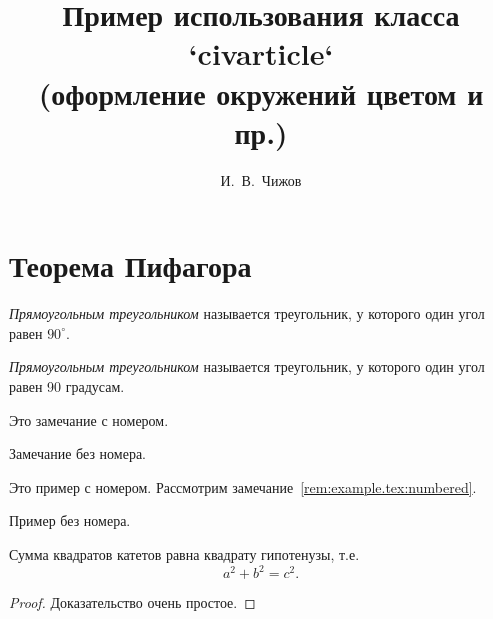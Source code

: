 \documentclass[colorthm, toc]{../civarticle}
\title{
    Пример использования класса `civarticle`\\
    \small{(оформление окружений цветом и пр.)}
}
\author{И.~В.~Чижов}
\begin{document}
\blindmathtrue

\begin{abstract}
  \Blindtext[2]
\end{abstract}

\civkeywords

\section{Теорема Пифагора}
\label{sec:thm-pif}

\begin{definition}\label{def:example.tex:triange}
  \emph{Прямоугольным треугольником} называется треугольник, у
  которого один угол равен \(90^{\circ}\).
\end{definition}

\Blindtext[2]

\begin{definition*}
  \emph{Прямоугольным треугольником} называется треугольник, у
  которого один угол равен 90 градусам.
\end{definition*}

\blindmathtrue\blindmathpaper

\begin{remark} \label{rem:example.tex:numbered}
  Это замечание с номером.
  \blindtext%
\end{remark}

\Blindtext[2]

\begin{remark*}
  Замечание без номера.

  \Blindtext[2]
\end{remark*}

\Blindtext[2]

\begin{example}\label{ex:example:myexample}
  Это пример с номером.
  Рассмотрим замечание~\ref{rem:example.tex:numbered}.
  \Blindtext[2]
\end{example}

\Blindtext[2]

\blinditemize%

\blindenumerate%

\blinddescription%

\begin{example*}
  Пример без номера.
  \Blindtext[2]
\end{example*}

\Blindtext[2]

\begin{theorem}
  Сумма квадратов катетов равна квадрату гипотенузы, т.е.
  \begin{equation}
    \label{eq:thm-pif}
    a^2+b^2=c^2.
  \end{equation}
\end{theorem}
\begin{proof}
  Доказательство очень простое.
\end{proof}
\end{document}
